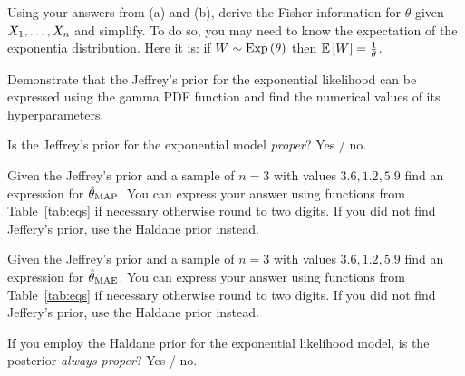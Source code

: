 \documentclass[12pt]{article}
\begin{document}
 Using your answers from (a) and (b), derive the Fisher information for $\theta$ given $X_1, \ldots, X_n$ and simplify. To do so, you may need to know the expectation of the exponentia distribution. Here it is: if $W \sim \mathrm{Exp}\left(\theta\right)$  then $\mathbb{E}\left[W\right] = \frac{1}{\theta}$. 


 Demonstrate that the Jeffrey's prior for the exponential likelihood can be expressed using the gamma PDF function and find the numerical values of its hyperparameters. 


Is the Jeffrey's prior for the exponential model \textit{proper}? Yes / no.

 Given the Jeffrey's prior and a sample of $n=3$ with values $3.6, 1.2, 5.9$ find an expression for $\hat{\theta}_{\mathrm{MAP}}$. You can express your answer using functions from Table~\ref{tab:eqs} if necessary otherwise round to two digits. If you did not find Jeffery's prior, use the Haldane prior instead.


 Given the Jeffrey's prior and a sample of $n=3$ with values $3.6, 1.2, 5.9$ find an expression for $\hat{\theta}_{\mathrm{MAE}}$. You can express your answer using functions from Table~\ref{tab:eqs} if necessary otherwise round to two digits. If you did not find Jeffery's prior, use the Haldane prior instead.


 If you employ the Haldane prior for the exponential likelihood model, is the posterior \textit{always proper}? Yes / no.

\eenum
\end{document}
